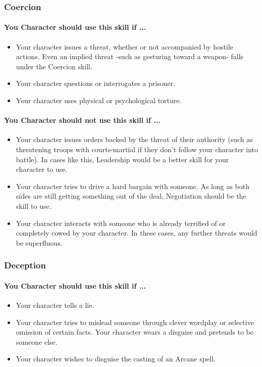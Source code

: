 \begin{multicols}{2}
\subsubsection{Coercion}\label{skill:coercion}
\paragraph{You Character should use this skill if ...}
\begin{itemize}
    \item Your character issues a threat, whether or not accompanied by hostile
      actions. Even an implied threat -such as gesturing toward a weapon- falls
      under the Coercion skill.
    \item Your character questions or interrogates a prisoner.
    \item Your character uses physical or psychological torture.
\end{itemize}
\paragraph{You Character should not use this skill if ...}
\begin{itemize}
    \item Your character issues orders backed by the threat of their authority (such
      as threatening troops with courts-martial if they don't follow your character
      into battle). In cases like this, Leadership would be a better skill for
      your character to use.
    \item Your character tries to drive a hard bargain with someone. As long as both
      sides are still getting something out of the deal, Negotiation should be
      the skill to use.
    \item Your character interacts with someone who is already terrified of or
      completely cowed by your character. In these cases, any further threats
      would be superfluous.
\end{itemize}

\subsubsection{Deception}\label{skill:deception}
\paragraph{You Character should use this skill if ...}
\begin{itemize}
    \item Your character tells a lie.
    \item Your character tries to mislead someone through clever wordplay or
      selective omission of certain facts. Your character wears a disguise and
      pretends to be someone else.
    \item Your character wishes to disguise the casting of an Arcane spell.
\end{itemize}

\end{multicols}
